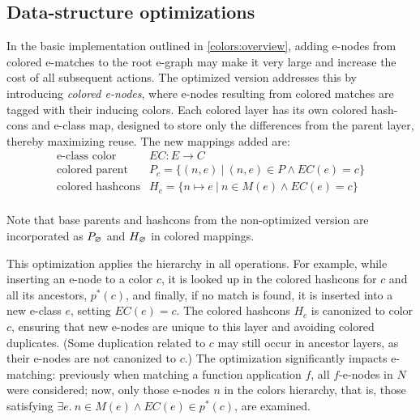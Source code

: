 \subsection{Data-structure optimizations}
In the basic implementation outlined in \autoref{colors:overview}, adding e-nodes from colored e-matches to the root e-graph may make it very large and increase the cost of all subsequent actions. 
The optimized version addresses this by introducing \emph{colored e-nodes}, where e-nodes resulting from colored matches are tagged with their inducing colors. 
Each colored layer has its own colored hash-cons and e-class map, designed to store only the differences from the parent layer, thereby maximizing reuse.
The new mappings added are:
%
\[
\renewcommand\arraystretch{1.2}
\begin{array}{ll}
  \mbox{e-class color}& \! \! EC : E \to C  \\
  \mbox{colored parent}& \! \! P_c = \{ (n, e) ~|~ (n, e) \in P \land EC(e) = c \} \\
  \mbox{colored hashcons}& \! \! H_c = \{n \mapsto e ~|~ n \in M(e) \land EC(e) = c \} \\
\end{array}
\]

Note that base parents and hashcons from the non-optimized version are incorporated as $P_\varnothing$ and $H_\varnothing$ in colored mappings.

This optimization applies the hierarchy in all operations. 
For example, while inserting an e-node to a color $c$, it is looked up in the colored hash\-cons for $c$ and all its ancestors, $p^*\!(c)$, and finally, if no match is found, it is inserted into a new e-class $e$, setting $EC(e) = c$.
The colored hashcons $H_c$ is canonized to color $c$, ensuring that new e-nodes are unique to this layer and avoiding colored duplicates. 
(Some duplication related to $c$ may still occur in ancestor layers, as their e-nodes are not canonized to $c$.)
The optimization significantly impacts e-matching: previously when matching a function application $f$, all $f$-e-nodes in $N$ were considered; now, only those e-nodes $n$ in the colors hierarchy, that is, those satisfying $\exists e.~n \in M(e) \land EC(e) \in p^*(c)$, are examined.


